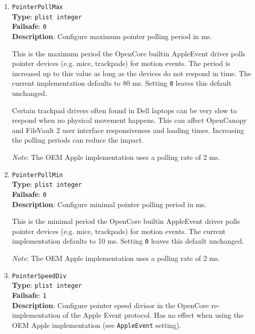 \documentclass[]{article}
\begin{document}
\begin{enumerate}
  The amount of pointer devices available in the system can be
  found in the log. Refer to \texttt{Found N pointer devices} message
  for more details.

  \emph{Note}: Has no effect when using the OEM Apple implementation
  (see \texttt{AppleEvent} setting).

\item
  \texttt{PointerPollMax}\\
  \textbf{Type}: \texttt{plist\ integer}\\
  \textbf{Failsafe}: \texttt{0}\\
  \textbf{Description}: Configure maximum pointer polling period in ms.

  This is the maximum period the OpenCore builtin AppleEvent driver polls
  pointer devices (e.g. mice, trackpads) for motion events. The period
  is increased up to this value as long as the devices do not respond
  in time. The current implementation defaults to 80 ms. Setting
  \texttt{0} leaves this default unchanged.

  Certain trackpad drivers often found in Dell laptops can be very slow
  to respond when no physical movement happens. This can affect
  OpenCanopy and FileVault 2 user interface responsiveness and loading times.
  Increasing the polling periods can reduce the impact.

  \emph{Note}: The OEM Apple implementation uses a polling rate of 2 ms.

\item
  \texttt{PointerPollMin}\\
  \textbf{Type}: \texttt{plist\ integer}\\
  \textbf{Failsafe}: \texttt{0}\\
  \textbf{Description}: Configure minimal pointer polling period in ms.

  This is the minimal period the OpenCore builtin AppleEvent driver polls
  pointer devices (e.g. mice, trackpads) for motion events. The current
  implementation defaults to 10 ms. Setting \texttt{0} leaves this
  default unchanged.

  \emph{Note}: The OEM Apple implementation uses a polling rate of 2 ms.

\item
  \texttt{PointerSpeedDiv}\\
  \textbf{Type}: \texttt{plist\ integer}\\
  \textbf{Failsafe}: \texttt{1}\\
  \textbf{Description}: Configure pointer speed divisor in the OpenCore re-implementation
  of the Apple Event protocol.
  Has no effect when using the OEM Apple implementation (see \texttt{AppleEvent} setting).


\end{enumerate}
\end{document}
